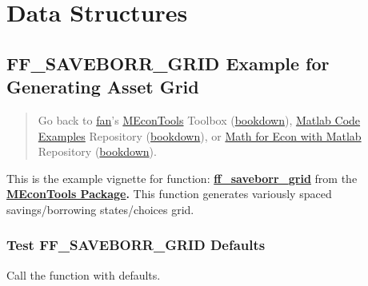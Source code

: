 \documentclass[
]{book}
\begin{document}
\hypertarget{data-structures}{%
\chapter{Data Structures}\label{data-structures}}

\hypertarget{ff_saveborr_grid-example-for-generating-asset-grid}{%
\section{FF\_SAVEBORR\_GRID Example for Generating Asset Grid}\label{ff_saveborr_grid-example-for-generating-asset-grid}}

\begin{quote}
Go back to \href{http://fanwangecon.github.io/}{fan}'s \href{https://fanwangecon.github.io/MEconTools/}{MEconTools} Toolbox (\href{https://fanwangecon.github.io/MEconTools/bookdown}{bookdown}), \href{https://fanwangecon.github.io/M4Econ/}{Matlab Code Examples} Repository (\href{https://fanwangecon.github.io/M4Econ/bookdown}{bookdown}), or \href{https://fanwangecon.github.io/Math4Econ/}{Math for Econ with Matlab} Repository (\href{https://fanwangecon.github.io/Math4Econ/bookdown}{bookdown}).
\end{quote}

This is the example vignette for function:
\href{https://github.com/FanWangEcon/MEconTools/blob/master/MEconTools/generate/ff_saveborr_grid.m}{\textbf{ff\_saveborr\_grid}}
from the \href{https://fanwangecon.github.io/MEconTools/}{\textbf{MEconTools
Package}}\textbf{.} This function
generates variously spaced savings/borrowing states/choices grid.

\hypertarget{test-ff_saveborr_grid-defaults}{%
\subsection{Test FF\_SAVEBORR\_GRID Defaults}\label{test-ff_saveborr_grid-defaults}}

Call the function with defaults.
\end{document}
